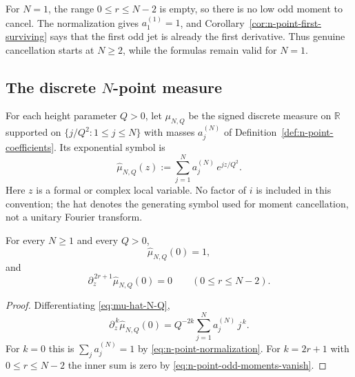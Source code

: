 \begin{remark}[The case \(N=1\)]
\label{rem:n-point-N-equals-one}
For \(N=1\), the range \(0\le r\le N-2\) is empty, so there is no
low odd moment to cancel.  The normalization gives \(a_1^{(1)}=1\), and
Corollary~\ref{cor:n-point-first-surviving} says that the first odd
jet is already the first derivative.  Thus genuine cancellation starts
at \(N\ge2\), while the formulas remain valid for \(N=1\).
\end{remark}


\subsection{The discrete \(N\)-point measure}
\label{subsec:n-point-measure}

\begin{definition}
\label{def:n-point-measure}
For each height parameter \(Q>0\), let \(\mu_{N,Q}\) be the signed
discrete measure on \(\mathbb R\) supported on
\(\{j/Q^2:1\le j\le N\}\) with masses \(a_j^{(N)}\) of
Definition~\ref{def:n-point-coefficients}.  Its exponential symbol is
\begin{equation}
\label{eq:mu-hat-N-Q}
        \widehat\mu_{N,Q}(z)
        := \sum_{j=1}^N a_j^{(N)}\, e^{j z / Q^2}.
\end{equation}
Here \(z\) is a formal or complex local variable.  No factor of \(i\) is
included in this convention; the hat denotes the generating symbol used
for moment cancellation, not a unitary Fourier transform.
\end{definition}

\begin{lemma}
\label{lem:n-point-odd-moment-cancellation}
For every \(N\ge 1\) and every \(Q>0\),
\begin{equation}
\label{eq:mu-hat-normalization}
        \widehat\mu_{N,Q}(0) = 1,
\end{equation}
and
\begin{equation}
\label{eq:mu-hat-odd-vanishing}
        \partial_z^{\,2r+1}\widehat\mu_{N,Q}(0) = 0
        \qquad (0 \le r \le N - 2).
\end{equation}
\end{lemma}

\begin{proof}
Differentiating \eqref{eq:mu-hat-N-Q},
\[
        \partial_z^{\,k}\widehat\mu_{N,Q}(0)
        = Q^{-2k}\sum_{j=1}^N a_j^{(N)}\, j^{\,k}.
\]
For \(k=0\) this is \(\sum_j a_j^{(N)} = 1\) by
\eqref{eq:n-point-normalization}.  For \(k=2r+1\) with \(0\le r\le N-2\)
the inner sum is zero by \eqref{eq:n-point-odd-moments-vanish}.
\end{proof}

